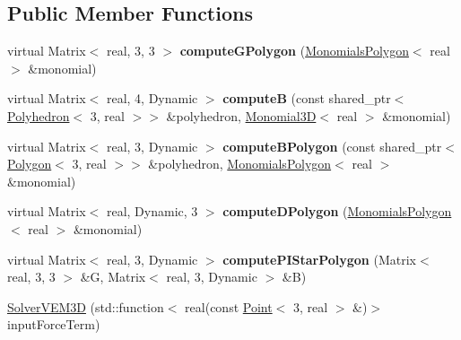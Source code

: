 \subsection*{Public Member Functions}
\begin{DoxyCompactItemize}
\item 
virtual Matrix$<$ real, 3, 3 $>$ {\bfseries compute\+G\+Polygon} (\hyperlink{class_monomials_polygon}{Monomials\+Polygon}$<$ real $>$ \&monomial)\hypertarget{class_solver_v_e_m3_d_ac318979a89811fbaf443188a13348f8f}{}\label{class_solver_v_e_m3_d_ac318979a89811fbaf443188a13348f8f}

\item 
virtual Matrix$<$ real, 4, Dynamic $>$ {\bfseries computeB} (const shared\+\_\+ptr$<$ \hyperlink{class_polyhedron}{Polyhedron}$<$ 3, real $>$$>$ \&polyhedron, \hyperlink{class_monomials}{Monomial3D}$<$ real $>$ \&monomial)\hypertarget{class_solver_v_e_m3_d_ac87df82bf52bde30ba14e00ca049faf8}{}\label{class_solver_v_e_m3_d_ac87df82bf52bde30ba14e00ca049faf8}

\item 
virtual Matrix$<$ real, 3, Dynamic $>$ {\bfseries compute\+B\+Polygon} (const shared\+\_\+ptr$<$ \hyperlink{class_polygon}{Polygon}$<$ 3, real $>$$>$ \&polyhedron, \hyperlink{class_monomials_polygon}{Monomials\+Polygon}$<$ real $>$ \&monomial)\hypertarget{class_solver_v_e_m3_d_afe89753106e3d3be0fdce44620fbbc03}{}\label{class_solver_v_e_m3_d_afe89753106e3d3be0fdce44620fbbc03}

\item 
virtual Matrix$<$ real, Dynamic, 3 $>$ {\bfseries compute\+D\+Polygon} (\hyperlink{class_monomials_polygon}{Monomials\+Polygon}$<$ real $>$ \&monomial)\hypertarget{class_solver_v_e_m3_d_a390dd7d1654bee6686b76e6a08579416}{}\label{class_solver_v_e_m3_d_a390dd7d1654bee6686b76e6a08579416}

\item 
virtual Matrix$<$ real, 3, Dynamic $>$ {\bfseries compute\+P\+I\+Star\+Polygon} (Matrix$<$ real, 3, 3 $>$ \&G, Matrix$<$ real, 3, Dynamic $>$ \&B)\hypertarget{class_solver_v_e_m3_d_ae5ebe2417660a9688446d93e998579cc}{}\label{class_solver_v_e_m3_d_ae5ebe2417660a9688446d93e998579cc}

\item 
\hyperlink{class_solver_v_e_m3_d_ab47c381f6c5708f5d6874f7b22c8d0d9}{Solver\+V\+E\+M3D} (std\+::function$<$ real(const \hyperlink{class_point}{Point}$<$ 3, real $>$ \&)$>$ input\+Force\+Term)\hypertarget{class_solver_v_e_m3_d_ab47c381f6c5708f5d6874f7b22c8d0d9}{}\label{class_solver_v_e_m3_d_ab47c381f6c5708f5d6874f7b22c8d0d9}


\end{DoxyCompactItemize}
